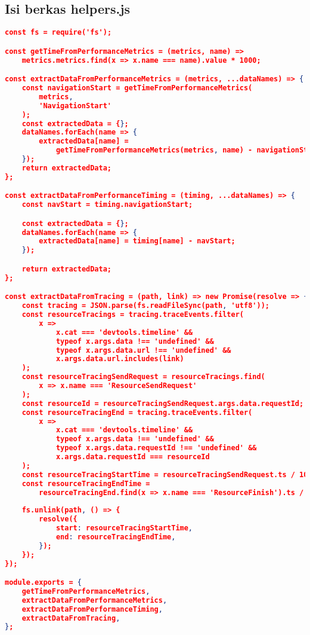 	\subsection*{Isi berkas helpers.js}
\begin{lstlisting}[frame=single,tabsize=2,breaklines,caption={Isi berkas helpers.js},label=helperjs, captionpos=b, language=json]
const fs = require('fs');

const getTimeFromPerformanceMetrics = (metrics, name) =>
	metrics.metrics.find(x => x.name === name).value * 1000;

const extractDataFromPerformanceMetrics = (metrics, ...dataNames) => {
	const navigationStart = getTimeFromPerformanceMetrics(
		metrics,
		'NavigationStart'
	);
	const extractedData = {};
	dataNames.forEach(name => {
		extractedData[name] =
			getTimeFromPerformanceMetrics(metrics, name) - navigationStart;
	});
	return extractedData;
};

const extractDataFromPerformanceTiming = (timing, ...dataNames) => {
	const navStart = timing.navigationStart;

	const extractedData = {};
	dataNames.forEach(name => {
		extractedData[name] = timing[name] - navStart;
	});

	return extractedData;
};

const extractDataFromTracing = (path, link) => new Promise(resolve => {
	const tracing = JSON.parse(fs.readFileSync(path, 'utf8'));
	const resourceTracings = tracing.traceEvents.filter(
		x =>
			x.cat === 'devtools.timeline' &&
			typeof x.args.data !== 'undefined' &&
			typeof x.args.data.url !== 'undefined' &&
			x.args.data.url.includes(link)
	);
	const resourceTracingSendRequest = resourceTracings.find(
		x => x.name === 'ResourceSendRequest'
	);
	const resourceId = resourceTracingSendRequest.args.data.requestId;
	const resourceTracingEnd = tracing.traceEvents.filter(
		x =>
			x.cat === 'devtools.timeline' &&
			typeof x.args.data !== 'undefined' &&
			typeof x.args.data.requestId !== 'undefined' &&
			x.args.data.requestId === resourceId
	);
	const resourceTracingStartTime = resourceTracingSendRequest.ts / 1000;
	const resourceTracingEndTime =
		resourceTracingEnd.find(x => x.name === 'ResourceFinish').ts / 1000;
	
	fs.unlink(path, () => {
		resolve({
			start: resourceTracingStartTime,
			end: resourceTracingEndTime,
		});
	});
});

module.exports = {
	getTimeFromPerformanceMetrics,
	extractDataFromPerformanceMetrics,
	extractDataFromPerformanceTiming,
	extractDataFromTracing,
};
\end{lstlisting}

